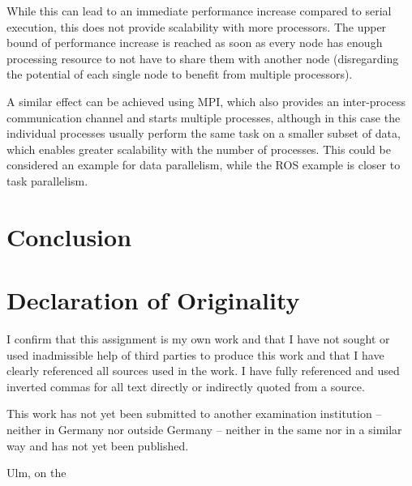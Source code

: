 \documentclass[BCOR20mm,DIV14,10pt,headinclude,footexclude,bibtotoc,liststotoc]{article}
\begin{document}
While this can lead to an immediate performance increase compared to serial
execution, this does not provide scalability with more processors. The upper
bound of performance increase is reached as soon as every node has enough
processing resource to not have to share them with another node (disregarding
the potential of each single node to benefit from multiple processors).

A similar effect can be achieved using MPI, which also provides an inter-process
communication channel and starts multiple processes, although in this case the
individual processes usually perform the same task on a smaller subset of data,
which enables greater scalability with the number of processes. This could be
considered an example for data parallelism, while the ROS example is closer to
task parallelism.

\section{Conclusion}

\cleardoublepage
\section*{Declaration of Originality}

I confirm that this assignment is my own work and that I have not sought or used
inadmissible help of third parties to produce this work and that I have clearly
referenced all sources used in the work. I have fully referenced and used
inverted commas for all text directly or indirectly quoted from a source.

This work has not yet been submitted to another examination institution –
neither in Germany nor outside Germany – neither in the same nor in a similar
way and has not yet been published.

\vspace{2cm}

Ulm, on the \dotfill

\hspace{10cm} {\footnotesize \theauthor}
\end{document}
